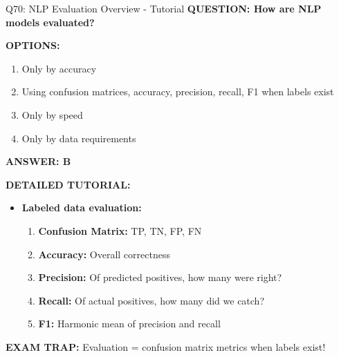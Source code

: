 \documentclass[8pt]{beamer}
\begin{document}
	\begin{frame}{Q70: NLP Evaluation Overview - Tutorial}
		\fontsize{6.5}{7.5}\selectfont
		\textbf{QUESTION: How are NLP models evaluated?}
		
		\vspace{0.1cm}
		\textbf{OPTIONS:}
		\begin{enumerate}
			\item Only by accuracy
			\item Using confusion matrices, accuracy, precision, recall, F1 when labels exist
			\item Only by speed
			\item Only by data requirements
		\end{enumerate}
		
		\vspace{0.1cm}
		\textcolor{myblue}{\textbf{ANSWER: B}}
		
		\vspace{0.1cm}
		\textbf{DETAILED TUTORIAL:}
		\begin{itemize}
			\item \textbf{Labeled data evaluation:}
			\begin{enumerate}
				\item \textbf{Confusion Matrix:} TP, TN, FP, FN
				\item \textbf{Accuracy:} Overall correctness
				\item \textbf{Precision:} Of predicted positives, how many were right?
				\item \textbf{Recall:} Of actual positives, how many did we catch?
				\item \textbf{F1:} Harmonic mean of precision and recall
			\end{enumerate}
		\end{itemize}
		
		\textcolor{myred}{\textbf{EXAM TRAP:}} Evaluation = \textcolor{myblue}{confusion matrix metrics} when labels exist!
	\end{frame}
	
	
\end{document}
